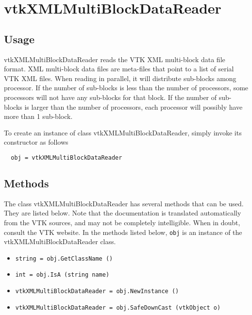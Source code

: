 \section{vtkXMLMultiBlockDataReader}

\subsection{Usage}

 vtkXMLMultiBlockDataReader reads the VTK XML multi-block data file
 format. XML multi-block data files are meta-files that point to a list
 of serial VTK XML files. When reading in parallel, it will distribute
 sub-blocks among processor. If the number of sub-blocks is less than
 the number of processors, some processors will not have any sub-blocks
 for that block. If the number of sub-blocks is larger than the
 number of processors, each processor will possibly have more than
 1 sub-block.

To create an instance of class vtkXMLMultiBlockDataReader, simply
invoke its constructor as follows
\begin{verbatim}
  obj = vtkXMLMultiBlockDataReader
\end{verbatim}
\subsection{Methods}

The class vtkXMLMultiBlockDataReader has several methods that can be used.
  They are listed below.
Note that the documentation is translated automatically from the VTK sources,
and may not be completely intelligible.  When in doubt, consult the VTK website.
In the methods listed below, \verb|obj| is an instance of the vtkXMLMultiBlockDataReader class.
\begin{itemize}
\item  \verb|string = obj.GetClassName ()|

\item  \verb|int = obj.IsA (string name)|

\item  \verb|vtkXMLMultiBlockDataReader = obj.NewInstance ()|

\item  \verb|vtkXMLMultiBlockDataReader = obj.SafeDownCast (vtkObject o)|

\end{itemize}
